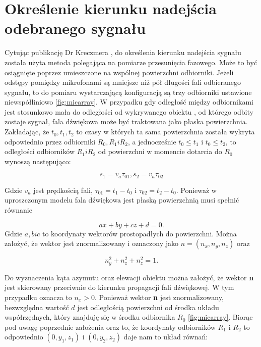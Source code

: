 \section{Określenie kierunku nadejścia odebranego sygnału}
Cytując publikację Dr Kreczmera \cite{Kreczmer:2020:Azimuth:Elevation},
do określenia kierunku nadejścia sygnału została użyta metoda polegająca na pomiarze przesunięcia fazowego.
Może to być osiągnięte poprzez umieszczone na wspólnej powierzchni odbiorniki. 
Jeżeli odstępy pomiędzy mikrofonami są mniejsze niż pół długości fali odbieranego sygnału, 
to do pomiaru wystarczającą konfiguracją są trzy odbiorniki ustawione niewspółliniowo \ref{fig:micarray}.
W przypadku gdy odległość między odbiornikami jest stosunkowo mała do odległości od wykrywanego obiektu , 
od którego odbity zostaje sygnał, fala dźwiękowa może być traktowana jako płaska powierzchnia. 
Zakładając, że $ t_0, t_1, t_2 $ to czasy w których ta sama powierzchnia została wykryta odpowiednio przez odbiorniki $R_0, R_1 i R_2$, 
a jednocześnie $t_0 \leq t_1$ i $t_0 \leq t_2$, to odległości odbiorników $R_1 i R_2$ 
od powierzchni w momencie dotarcia do $R_0$ wynoszą następująco:

\begin{equation}
	s_1 = v_a\tau_{01}, s_2 = v_a\tau_{02}
\end{equation}

Gdzie $v_a$ jest prędkością fali, $\tau_{01} = t_1-t_0$ i $\tau_{02} = t_2-t_0$. 
Ponieważ w uproszczonym modelu fala dźwiękowa jest płaską powierzchnią musi spełnić równanie

\begin{equation}
	ax + by +cz+d = 0.
\end{equation}
Gdzie $a, b i c$ to koordynaty wektorów prostopadłych do powierzchni. Można założyć, że wektor jest znormalizowany i oznaczony jako $n = (n_x, n_y, n_z)$ oraz

\begin{equation}
	n_y^2 + n_z^2 + n_z^2 = 1.
\end{equation}

Do wyznaczenia kąta azymutu oraz elewacji obiektu można założyć, że wektor \textbf{n} jest skierowany przeciwnie 
do kierunku propagacji fali dźwiękowej. W tym przypadku oznacza to $n_x > 0$. Ponieważ wektor \textbf{n} jest znormalizowany, 
bezwzględna wartość $d$ jest odległością powierzchni od środka układu współrzędnych, 
który znajduję się w środku odbiornika $R_0$ \ref{fig:micarray}.
Biorąc pod uwagę poprzednie założenia oraz to, że koordynaty odbiorników $R_1$ i $R_2$ 
to odpowiednio $(0, y_1, z_1)$ i $(0, y_2, z_2)$ daje nam to układ równań:


